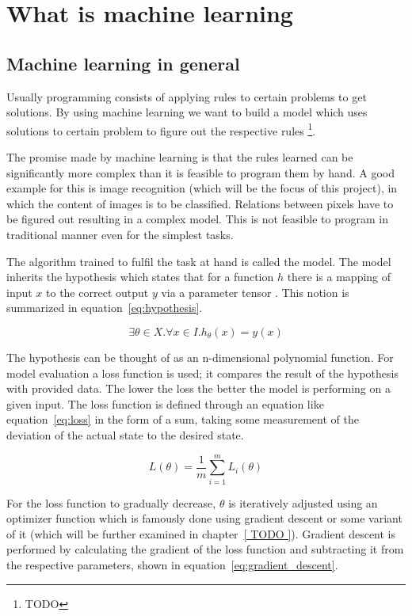 \section{What is machine learning} \label{ch:what_is_ml}

\subsection{Machine learning in general}

Usually programming consists of applying rules to certain problems to get solutions.
By using machine learning we want to build a model which uses
solutions to certain problem to figure out the respective rules \footnote{ TODO }.

The promise made by machine learning is that the rules learned can be significantly more
complex than it is feasible to program them by hand.
A good example for this is image recognition (which will be the focus of this project),
in which the content of images is to be classified. Relations between pixels have to be
figured out resulting in a complex model. This is not feasible to program in traditional
manner even for the simplest tasks.

The algorithm trained to fulfil the task at hand is called the model.
The model inherits the hypothesis which states that for a function $h$ there is a
mapping of input $x$ to the correct output $y$ via a parameter tensor \theta.
This notion is summarized in equation~\eqref{eq:hypothesis}.

\begin{equation} \label{eq:hypothesis}
\exists \theta \in X . \forall x \in I . h_\theta(x) = y(x)
\end{equation}

The hypothesis can be thought of as an n-dimensional polynomial function.
For model evaluation a loss function is used;
it compares the result of the hypothesis with provided data.
The lower the loss the better the model is performing on a given input.
The loss function is defined through an equation like equation~\eqref{eq:loss}
in the form of a sum, taking some measurement
of the deviation of the actual state to the desired state.

\begin{equation} \label{eq:loss}
L(\theta) = \frac{1}{m} \sum_{i=1}^m L_i(\theta)
\end{equation}

For the loss function to gradually decrease, $\theta$ is iteratively adjusted using an
optimizer function which is famously done using gradient descent or some variant of it (which will
be further examined in chapter~\ref{ TODO }).
Gradient descent is performed by calculating the gradient of the loss function and subtracting it
from the respective parameters, shown in equation~\eqref{eq:gradient_descent}.

